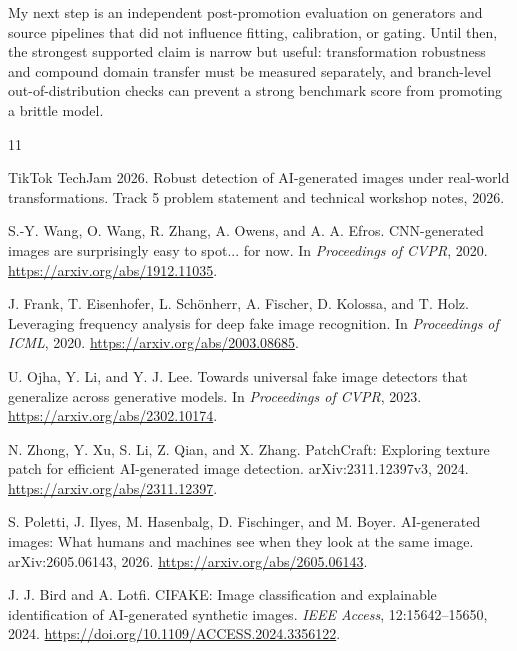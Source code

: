 \documentclass[10pt,twocolumn]{article}
\begin{document}
My next step is an independent post-promotion evaluation on generators and source pipelines that did
not influence fitting, calibration, or gating. Until then, the strongest supported claim is narrow but
useful: transformation robustness and compound domain transfer must be measured separately, and
branch-level out-of-distribution checks can prevent a strong benchmark score from promoting a brittle
model.

\begin{thebibliography}{11}
\small

TikTok TechJam 2026.
\newblock Robust detection of AI-generated images under real-world transformations.
\newblock Track 5 problem statement and technical workshop notes, 2026.

S.-Y. Wang, O. Wang, R. Zhang, A. Owens, and A. A. Efros.
\newblock CNN-generated images are surprisingly easy to spot... for now.
\newblock In \emph{Proceedings of CVPR}, 2020.
\newblock \url{https://arxiv.org/abs/1912.11035}.

J. Frank, T. Eisenhofer, L. Sch\"onherr, A. Fischer, D. Kolossa, and T. Holz.
\newblock Leveraging frequency analysis for deep fake image recognition.
\newblock In \emph{Proceedings of ICML}, 2020.
\newblock \url{https://arxiv.org/abs/2003.08685}.

U. Ojha, Y. Li, and Y. J. Lee.
\newblock Towards universal fake image detectors that generalize across generative models.
\newblock In \emph{Proceedings of CVPR}, 2023.
\newblock \url{https://arxiv.org/abs/2302.10174}.

N. Zhong, Y. Xu, S. Li, Z. Qian, and X. Zhang.
\newblock PatchCraft: Exploring texture patch for efficient AI-generated image detection.
\newblock arXiv:2311.12397v3, 2024.
\newblock \url{https://arxiv.org/abs/2311.12397}.

S. Poletti, J. Ilyes, M. Hasenbalg, D. Fischinger, and M. Boyer.
\newblock AI-generated images: What humans and machines see when they look at the same image.
\newblock arXiv:2605.06143, 2026.
\newblock \url{https://arxiv.org/abs/2605.06143}.

J. J. Bird and A. Lotfi.
\newblock CIFAKE: Image classification and explainable identification of AI-generated synthetic
images.
\newblock \emph{IEEE Access}, 12:15642--15650, 2024.
\newblock \url{https://doi.org/10.1109/ACCESS.2024.3356122}.


\end{thebibliography}
\end{document}
